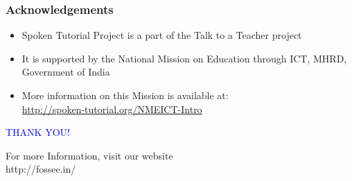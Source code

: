 \documentclass[17pt]{beamer}
\begin{document}
\begin{frame}
\frametitle{Acknowledgements}
\begin{itemize}
\item Spoken Tutorial Project is a part of the Talk to a Teacher  project 
\item It is supported by the National Mission on Education through  ICT, MHRD, Government of India 
\item More information on this Mission is available at: \\{\color{blue}\url{http://spoken-tutorial.org/NMEICT-Intro}}
\end{itemize}
\end{frame}
\begin{frame}

  \begin{block}{}
  \begin{center}
  \textcolor{blue}{\Large THANK YOU!} 
  \end{center}
  \end{block}
\begin{block}{}
  \begin{center}
    For more Information, visit our website\\
    {http://fossee.in/}
  \end{center}  
  \end{block}
\end{frame}
\end{document}

